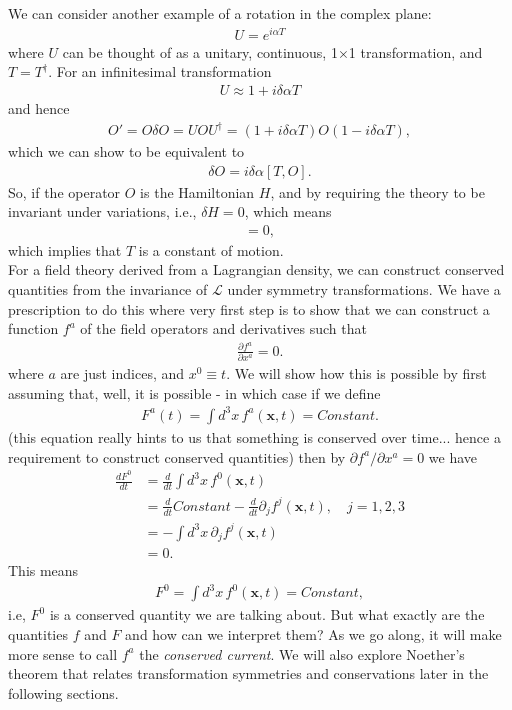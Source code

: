 \documentclass[a4paper,11pt]{article}
\numberwithin{equation}{section}
\theoremstyle{definition}
\newcommand{\p}{\partial}
\newcommand{\lag}{\mathcal{L}}
\begin{document}
We can consider another example of a rotation in the complex plane:
\begin{align}
U = e^{i\alpha T}
\end{align}
where $U$ can be thought of as a unitary, continuous, 1$\times$1 transformation, and $T = T^\dagger$. For an infinitesimal transformation
\begin{align}
U \approx 1 + i\delta \alpha T
\end{align}
and hence
\begin{align}
O' = O \delta O = UOU^\dagger = (1+i\delta \alpha T)O(1-i\delta \alpha T),
\end{align}
which we can show to be equivalent to
\begin{align}
\delta O = i\delta \alpha[T,O].
\end{align}
So, if the operator $O$ is the Hamiltonian $H$, and by requiring the theory to be invariant under variations, i.e., $\delta H = 0$, which means
\begin{align}
[T,H] = 0,
\end{align}
which implies that $T$ is a constant of motion. \\

For a field theory derived from a Lagrangian density, we can construct conserved quantities from the invariance of $\lag$ under symmetry transformations. We have a prescription to do this where very first step is to show that we can construct a function $f^a$ of the field operators and derivatives such that
\begin{align}
\frac{\p f^a}{\p x^a} = 0.
\end{align}
where $a$ are just indices, and $x^0 \equiv t$. We will show how this is possible by first assuming that, well, it is possible - in which case if we define 
\begin{align}
F^a(t) = \int d^3x\, f^a(\mathbf{x},t) = Constant.
\end{align}
(this equation really hints to us that something is conserved over time... hence a requirement to construct conserved quantities) then by $\p f^a/\p x^a = 0$ we have
\begin{align}
\frac{dF^0}{dt} &= \frac{d}{dt} \int d^3x\, f^0(\mathbf{x},t)\\
&= \frac{d}{dt}Constant - \frac{d}{dt} \p_j f^j(\mathbf{x},t),\,\,\,\,\,\, j = 1,2,3\\
&= -\int d^3x\, \p_j f^j(\mathbf{x},t)\\
&= 0.
\end{align}
This means
\begin{align}
F^0 = \int d^3x\, f^0(\mathbf{x},t) = Constant,
\end{align}
i.e, $F^0$ is a conserved quantity we are talking about. But what exactly are the quantities $f$ and $F$ and how can we interpret them? As we go along, it will make more sense to call $f^a$ the \textit{conserved current}. We will also explore Noether's theorem that relates transformation symmetries and conservations later in the following sections.\\
\end{document}
